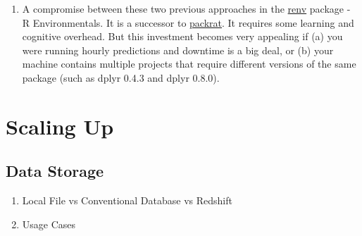 \documentclass[
]{book}
\providecommand{\tightlist}{%
  \setlength{\itemsep}{0pt}\setlength{\parskip}{0pt}}
\begin{document}
\begin{enumerate}
  A downside is that it can be difficult to set up a identical machine in a few months. Sometimes these packages have depend on packages that are incompatible with other package versions. For example, at one point, the current version of dplyr was 0.4.3. A few months later, the rlang package (which wasn't explicitly specified in the list of 42 packages) required at least version 0.8.0 of dplyr. The developer on the new machine needs to decide whether to upgrade dplyr (and test for breaking changes in the pipeline) or to install an older version of rlang.

  A second important downside is that this approach can lock all the user's projects to specific outdated package version.

  We and others\footnote{\href{https://insightindustry.com/}{Chris Modzelewski}} advocate this approach when your team is experienced with only R, and has a machine dedicated to an important line-of-business workflow.

  When uptime is important and your team is experienced with other languages like Java, Python, or C\#, consider if those would be better suited.
\item
  A compromise between these two previous approaches in the \href{https://rstudio.github.io/renv}{renv} package - R Environmentals. It is a successor to \href{https://rstudio.github.io/packrat/}{packrat}. It requires some learning and cognitive overhead. But this investment becomes very appealing if (a) you were running hourly predictions and downtime is a big deal, or (b) your machine contains multiple projects that require different versions of the same package (such as dplyr 0.4.3 and dplyr 0.8.0).
\end{enumerate}

\hypertarget{scaling-up}{%
\chapter{Scaling Up}\label{scaling-up}}

\hypertarget{data-storage}{%
\section{Data Storage}\label{data-storage}}

\begin{enumerate}
\def\labelenumi{\arabic{enumi}.}
\tightlist
\item
  Local File vs Conventional Database vs Redshift
\item
  Usage Cases
\end{enumerate}
\end{document}
